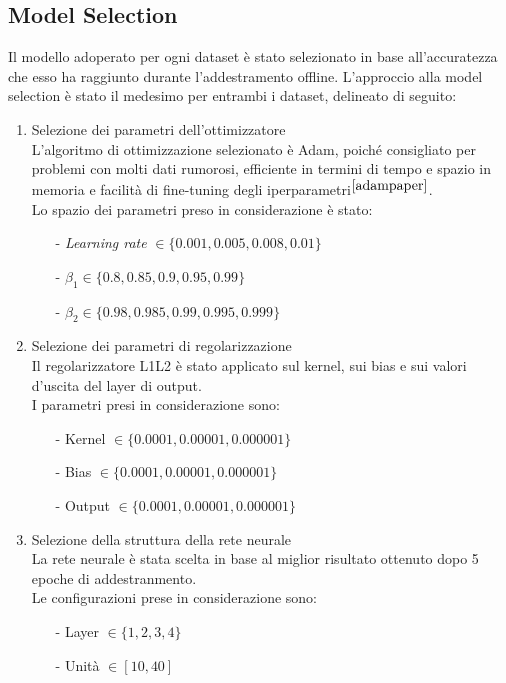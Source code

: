 \subsection{Model Selection}
Il modello adoperato per ogni dataset è stato selezionato in base all'accuratezza che esso ha raggiunto durante l'addestramento offline. L'approccio alla model selection è stato il medesimo per entrambi i dataset, delineato di seguito:
\begin{enumerate}
    \item Selezione dei parametri dell'ottimizzatore\\
    L'algoritmo di ottimizzazione selezionato è Adam, poiché consigliato per problemi con molti dati rumorosi, efficiente in termini di tempo e spazio in memoria e facilità di fine-tuning degli iperparametri$^{\cite{adampaper}}$.\\
    Lo spazio dei parametri preso in considerazione è stato:
    \begin{itemize}
        \item[-] \textit{Learning rate} $\in \{0.001, 0.005, 0.008, 0.01\}$
        \item[-] $\beta_1 \in \{0.8, 0.85, 0.9, 0.95, 0.99\}$
        \item[-] $\beta_2 \in \{0.98, 0.985, 0.99, 0.995, 0.999\}$
    \end{itemize}
    \item Selezione dei parametri di regolarizzazione\\
    Il regolarizzatore L1L2 è stato applicato sul kernel, sui bias e sui valori d'uscita del layer di output.\\
    I parametri presi in considerazione sono:
    \begin{itemize}
        \item[-] Kernel $\in \{0.0001, 0.00001, 0.000001\}$
        \item[-] Bias $\in \{0.0001, 0.00001, 0.000001\}$
        \item[-] Output $\in \{0.0001, 0.00001, 0.000001\}$
    \end{itemize}
    \item Selezione della struttura della rete neurale\\
    La rete neurale è stata scelta in base al miglior risultato ottenuto dopo 5 epoche di addestranmento.\\
    Le configurazioni prese in considerazione sono:
    \begin{itemize}
        \item[-] Layer $\in \{1, 2, 3, 4\}$
        \item[-] Unità $\in [10, 40]$
    \end{itemize}
\end{enumerate}
